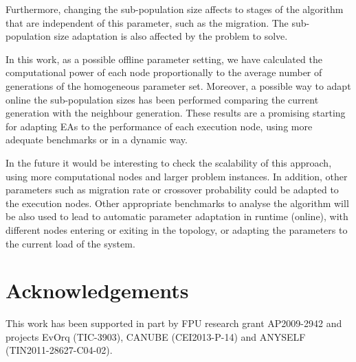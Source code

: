 \documentclass[final,1p,times]{elsarticle}
\begin{document}

Furthermore, changing the sub-population size affects to stages
of the algorithm that are independent of this parameter, such as
the migration. The sub-population size adaptation is also affected by the problem to solve.

In this work, as a possible offline parameter setting, we have calculated the computational power of each node proportionally 
to the average number of generations of the homogeneous parameter set. Moreover, a possible way to adapt 
online the sub-population sizes has been performed comparing the current generation with
 the neighbour generation. These results are a promising starting for adapting EAs to the
performance of each execution node, using more adequate benchmarks or in a dynamic way. 

In the future it would be interesting to check the scalability of this
approach, using more computational nodes and larger problem
instances. In addition, other parameters such as migration rate or
crossover probability could be adapted to the execution
nodes. Other appropriate benchmarks to analyse the algorithm will be also used to lead to automatic
parameter adaptation in runtime (online), with different nodes entering or
exiting in the topology, or adapting the parameters to the current load of the
system. 

\section*{Acknowledgements}
This work has been supported in part by FPU research grant AP2009-2942 and projects EvOrq (TIC-3903), CANUBE (CEI2013-P-14) and ANYSELF (TIN2011-28627-C04-02).

\end{document}
